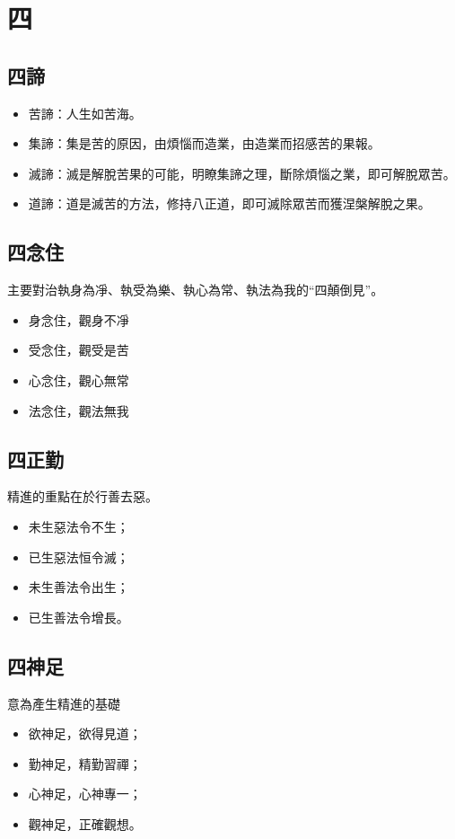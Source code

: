 \section{四}

\subsection{四諦}
\begin{itemize}
  \item 苦諦：人生如苦海。
  \item 集諦：集是苦的原因，由煩惱而造業，由造業而招感苦的果報。
  \item 滅諦：滅是解脫苦果的可能，明瞭集諦之理，斷除煩惱之業，即可解脫眾苦。
  \item 道諦：道是滅苦的方法，修持八正道，即可滅除眾苦而獲涅槃解脫之果。
\end{itemize}

\subsection{四念住}
主要對治執身為凈、執受為樂、執心為常、執法為我的“四顛倒見”。
\begin{itemize}
  \item 身念住，觀身不凈
  \item 受念住，觀受是苦
  \item 心念住，觀心無常
  \item 法念住，觀法無我
\end{itemize}

\subsection{四正勤}
精進的重點在於行善去惡。
\begin{itemize}
  \item 未生惡法令不生；
  \item 已生惡法恒令滅；
  \item 未生善法令出生；
  \item 已生善法令增長。
\end{itemize}


\subsection{四神足}
意為產生精進的基礎
\begin{itemize}
  \item 欲神足，欲得見道；
  \item 勤神足，精勤習禪；
  \item 心神足，心神專一；
  \item 觀神足，正確觀想。
\end{itemize}


